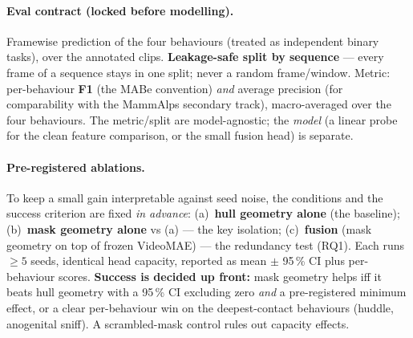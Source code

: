 \documentclass[11pt]{article}
\begin{document}
\paragraph{Eval contract (locked before modelling).} Framewise prediction of the four behaviours
(treated as independent binary tasks), over the annotated clips. \textbf{Leakage-safe split by
sequence} — every frame of a sequence stays in one split; never a random frame/window. Metric:
per-behaviour \textbf{F1} (the MABe convention) \emph{and} average precision (for comparability
with the MammAlps secondary track), macro-averaged over the four behaviours. The metric/split are
model-agnostic; the \emph{model} (a linear probe for the clean feature comparison, or the small
fusion head) is separate.

\paragraph{Pre-registered ablations.} To keep a small gain interpretable against seed noise, the
conditions and the success criterion are fixed \emph{in advance}: (a)~\textbf{hull geometry alone}
(the baseline); (b)~\textbf{mask geometry alone} vs (a) — the key isolation; (c)~\textbf{fusion}
(mask geometry on top of frozen VideoMAE) — the redundancy test (RQ1). Each runs $\geq 5$ seeds,
identical head capacity, reported as mean $\pm$ 95\,\% CI plus per-behaviour scores. \textbf{Success
is decided up front:} mask geometry helps iff it beats hull geometry with a 95\,\% CI excluding
zero \emph{and} a pre-registered minimum effect, or a clear per-behaviour win on the
deepest-contact behaviours (huddle, anogenital sniff). A scrambled-mask control rules out capacity
effects.

\end{document}
